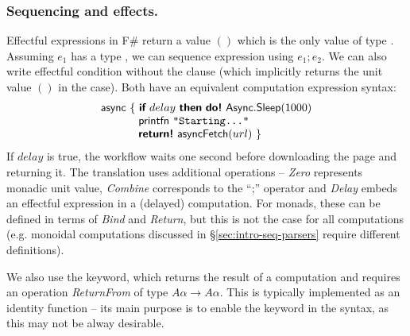\documentclass[runningheads,a4paper]{llncs}
\begin{document}
\vspace{-1em}
\subsubsection{Sequencing and effects.} Effectful expressions in F\# return a value $()$ which
is the only value of type . Assuming $e_1$ has a type , we can sequence 
expression using $e_1; e_2$. We can also write effectful  condition without the  
clause (which implicitly returns the unit value $()$ in the  case). Both have an 
equivalent computation expression syntax:
%
\begin{equation*}
\begin{array}{l}
\textnormal{\sffamily async}~\{~ \textnormal{\bfseries\sffamily if}~delay~\textnormal{\bfseries\sffamily then}~\textnormal{\bfseries\sffamily do!}~\textnormal{\sffamily Async}.\textnormal{\sffamily Sleep}(1000)\\
\hspace{3.4em}     \textnormal{\sffamily printfn}~ \texttt{"Starting..."}\\
\hspace{3.4em}     \textnormal{\bfseries\sffamily return!}~ \textnormal{\sffamily asyncFetch}(url) ~\}
\end{array}
\end{equation*}
%
If $delay$ is true, the workflow waits one second before downloading the page and returning it.
The translation uses additional operations -- \emph{Zero} represents monadic unit value,
\emph{Combine} corresponds to the ``;'' operator and \emph{Delay} embeds an effectful expression
in a (delayed) computation. For monads, these can be defined in terms of \emph{Bind} and \emph{Return},
but this is not the case for all computations (e.g. monoidal computations discussed in
\S\ref{sec:intro-seq-parsers} require different definitions).

We also use the  keyword, which returns the result of a computation and requires
an operation \emph{ReturnFrom} of type $A\alpha \rightarrow A\alpha$. This is typically
implemented as an identity function -- its main purpose is to enable the  keyword in 
the syntax, as this may not be alway desirable.
\end{document}
